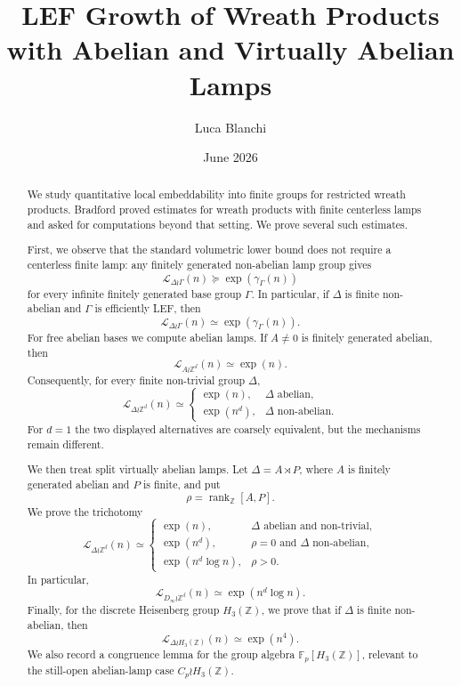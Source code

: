 \documentclass[11pt]{article}
\title{LEF Growth of Wreath Products with Abelian and Virtually Abelian Lamps}
\author{Luca Blanchi}
\date{June 2026}
\newcommand{\LEF}{\mathcal L}
\newcommand{\Z}{\mathbb Z}
\newcommand{\F}{\mathbb F}
\newcommand{\rank}{\operatorname{rank}}
\begin{document}
\maketitle

\begin{abstract}
We study quantitative local embeddability into finite groups for restricted wreath products.
Bradford proved estimates for wreath products with finite centerless lamps and asked for
computations beyond that setting. We prove several such estimates.

First, we observe that the standard volumetric lower bound does not require a centerless
finite lamp: any finitely generated non-abelian lamp group gives
\[
\LEF_{\Delta\wr\Gamma}(n)\succeq \exp(\gamma_\Gamma(n))
\]
for every infinite finitely generated base group \(\Gamma\). In particular, if \(\Delta\) is finite non-abelian and \(\Gamma\) is efficiently LEF, then
\[
\LEF_{\Delta\wr\Gamma}(n)\simeq \exp(\gamma_\Gamma(n)).
\]
For free abelian bases we compute abelian lamps. If \(A\neq 0\) is finitely generated abelian, then
\[
\LEF_{A\wr\Z^d}(n)\simeq \exp(n).
\]
Consequently, for every finite non-trivial group \(\Delta\),
\[
\LEF_{\Delta\wr\Z^d}(n)\simeq
\begin{cases}
\exp(n), & \Delta\text{ abelian},\\
\exp(n^d), & \Delta\text{ non-abelian}.
\end{cases}
\]
For \(d=1\) the two displayed alternatives are coarsely equivalent, but the mechanisms remain different.

We then treat split virtually abelian lamps. Let \(\Delta=A\rtimes P\), where \(A\) is finitely generated abelian and \(P\) is finite, and put
\[
\rho=\rank_\Z[A,P].
\]
We prove the trichotomy
\[
\LEF_{\Delta\wr\Z^d}(n)\simeq
\begin{cases}
\exp(n), & \Delta\text{ abelian and non-trivial},\\
\exp(n^d), & \rho=0\text{ and }\Delta\text{ non-abelian},\\
\exp(n^d\log n), & \rho>0.
\end{cases}
\]
In particular,
\[
\LEF_{D_\infty\wr\Z^d}(n)\simeq \exp(n^d\log n).
\]
Finally, for the discrete Heisenberg group \(H_3(\Z)\), we prove that if \(\Delta\) is finite non-abelian, then
\[
\LEF_{\Delta\wr H_3(\Z)}(n)\simeq \exp(n^4).
\]
We also record a congruence lemma for the group algebra \(\F_p[H_3(\Z)]\), relevant to the still-open abelian-lamp case \(C_p\wr H_3(\Z)\).
\end{abstract}
\end{document}
